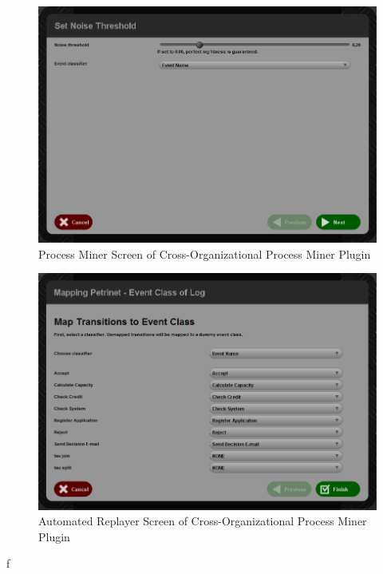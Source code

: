 \begin{figure}[ht]
	\centering
	\includegraphics[width=\textwidth]{8_appendix/proc-miner-threshold-screen}
	\caption{Process Miner Screen of Cross-Organizational Process Miner Plugin}
  \label{fig:proc-miner-threshold-screen}
\end{figure}

\begin{figure}[ht]
	\centering
	\includegraphics[width=\textwidth]{8_appendix/automated-replayer-screen}
	\caption{Automated Replayer Screen of Cross-Organizational Process Miner Plugin}
  \label{fig:automated-replayer-screen}
\end{figure}
f
